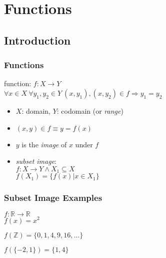\documentclass[dvipsnames]{beamer}
\begin{document}
\section{Functions}

\subsection{Introduction}

\begin{frame}
  \frametitle{Functions}

  \begin{definition}
    \alert{function}: $f: X \rightarrow Y$\\
    $\forall x \in X~\forall y_1,y_2 \in Y~
      (x,y_1),(x,y_2) \in f \Rightarrow y_1=y_2$
  \end{definition}

  \medskip
  \begin{itemize}
    \item $X$: \alert{domain}, $Y$: \alert{codomain} (or \emph{range})

    \pause
    \medskip
    \item $(x,y) \in f \equiv y = f(x)$
    \item $y$ is the \emph{image} of $x$ under $f$

    \pause
    \medskip
    \item \emph{subset image}:\\
      $f: X \rightarrow Y \wedge X_1 \subseteq X$\\
      $f(X_1) = \{ f(x) | x \in X_1\}$
 \end{itemize}
\end{frame}

\begin{frame}
  \frametitle{Subset Image Examples}

  \begin{example}
    $f: \mathbb{R} \rightarrow \mathbb{R}$\\
    $f(x) = x^2$

    \pause
    \bigskip
    $f(\mathbb{Z}) = \{0,1,4,9,16,\dots\}$

    \medskip
    $f(\{-2,1\}) = \{1,4\}$
  \end{example}
\end{frame}
\end{document}
